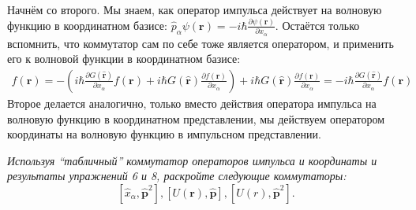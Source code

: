 Начнём со второго. Мы знаем, как оператор импульса действует на волновую функцию в координатном базисе: $\hat p_{\alpha} \psi(\mathbf r) = -i \hbar \frac{\partial \psi(\mathbf r)}{\partial x_{\alpha}}$. Остаётся только вспомнить, что коммутатор сам по себе тоже является оператором, и применить его к волновой функции в координатном базисе:
\begin{gather*}
    [\hat p_{\alpha}, G(\hat{\mathbf{r}})] f(\mathbf{r}) = -(i\hbar \frac{\partial G(\hat{\mathbf{r}})}{\partial x_{\alpha}}f(\mathbf{r}) + i\hbar G(\hat{\mathbf{r}}) \frac{\partial f(\mathbf{r})}{\partial x_{\alpha}}) + i\hbar G(\hat{\mathbf{r}})\frac{\partial f(\mathbf{r})}{\partial x_{\alpha}} = -i\hbar \frac{\partial G(\hat{\mathbf{r}})}{\partial x_{\alpha}} f(\mathbf{r})
\end{gather*}
Второе делается аналогично, только вместо действия оператора импульса на волновую функцию в координатном представлении, мы действуем оператором координаты на волновую функцию в импульсном представлении. 

\begin{center}
\textit{Используя ``табличный'' коммутатор операторов импульса и координаты и результаты упражнений 6 и 8, раскройте следующие коммутаторы:}
\[
[\hat x_{\alpha}, \hat{\mathbf{p}}^2], [U(\mathbf{r}), \hat{\mathbf{p}}], [U(r), \hat{\mathbf{p}}^2].
\]
\end{center}

